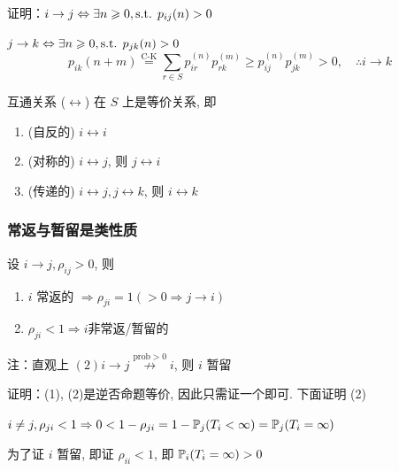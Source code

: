 证明：$i\to j\Leftrightarrow\exists n\geqslant 0,\text{s.t. } p_{ij}(n)>0$

$j\to k\Leftrightarrow\exists n\geqslant 0,\text{s.t. } p_{jk}(n)>0$
\[
p_{ik}(n+m)\overset{\text{C-K}}{=}\sum_{r\in S}p_{ir}^{(n)}p_{rk}^{(m)}\geq p_{ij}^{(n)}p_{jk}^{(m)}>0,\quad \therefore i\to k
\]

\begin{property}
    互通关系 ($\leftrightarrow$) 在 $S$ 上是等价关系, 即
    \begin{enumerate}
        \item (自反的) $i\leftrightarrow i$
        \item (对称的) $i\leftrightarrow j$, 则 $j\leftrightarrow i$
        \item (传递的) $i\leftrightarrow j, j\leftrightarrow k$, 则 $i\leftrightarrow k$
    \end{enumerate}
\end{property}

\subsubsection{常返与暂留是类性质}

\begin{lemma}\label{lem:commu_recurrent}
    设 $i\to j,\rho_{ij}>0$, 则
    \begin{enumerate}
        \item $i$ 常返的 $\Rightarrow \rho_{ji}=1(>0\Rightarrow j\to i)$ 
        \item $\rho_{ji}<1\Rightarrow i$非常返/暂留的
    \end{enumerate}
    注：直观上 $(2)i\to j\overset{\text{prob}>0}{\nrightarrow}i$, 则 $i$ 暂留
\end{lemma}

证明：(1), (2)是逆否命题等价, 因此只需证一个即可. 下面证明 (2)

$i\neq j,\rho_{ji}<1\Rightarrow 0<1-\rho_{ji}=1-\mathbb{P}_j(T_i<\infty)=\mathbb{P}_j(T_i=\infty)$

为了证 $i$ 暂留, 即证 $\rho_{ii}<1$, 即 $\mathbb{P}_i(T_i=\infty)>0$

